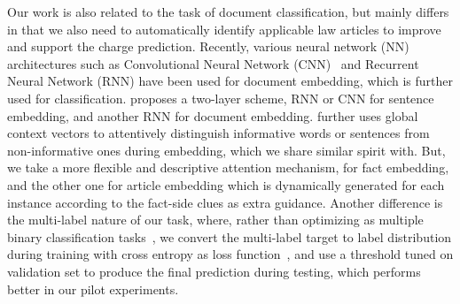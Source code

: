Our work is also related to the task of document classification, but mainly differs in that we also need to automatically identify applicable law articles to improve and support the charge prediction.
Recently, various neural network (NN) architectures such as Convolutional Neural Network (CNN)~\cite{kim2014convolutional} and Recurrent Neural Network (RNN) have been used for document embedding, which is further used for classification.
\cite{tang2015document} proposes a two-layer scheme, RNN or CNN for sentence embedding, and another RNN for document embedding.
\cite{yang2016hierarchical} further uses global context vectors to attentively distinguish informative words or sentences from non-informative ones during embedding, which we share similar spirit with. 
But, we take a more flexible and descriptive  attention mechanism,  for fact embedding, and the other one for article embedding which is  dynamically generated for each instance according to the fact-side clues as extra guidance.
%
Another difference is the multi-label nature of our task, where, rather than optimizing as multiple binary classification tasks~\cite{nam2014large}, 
we convert the multi-label target to label distribution during training with cross entropy as loss function~\cite{kurata2016improved}, and use a threshold tuned on validation set to produce the final prediction during testing, which performs better  in our pilot experiments.
